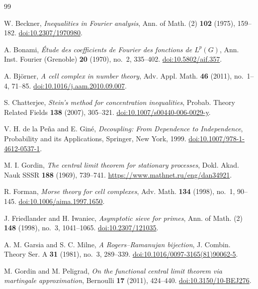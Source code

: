 \documentclass[11pt]{amsart}
\numberwithin{equation}{section}
\theoremstyle{plain}
\theoremstyle{definition}
\theoremstyle{remark}
\begin{document}
\begin{thebibliography}{99}

W. Beckner,
\emph{Inequalities in Fourier analysis},
Ann. of Math. (2) \textbf{102} (1975), 159--182.
\href{https://doi.org/10.2307/1970980}{doi:10.2307/1970980}.

A. Bonami,
\emph{\'Etude des coefficients de Fourier des fonctions de \(L^p(G)\)},
Ann. Inst. Fourier (Grenoble) \textbf{20} (1970), no.~2, 335--402.
\href{https://doi.org/10.5802/aif.357}{doi:10.5802/aif.357}.

A. Bj\"orner,
\emph{A cell complex in number theory},
Adv. Appl. Math. \textbf{46} (2011), no.~1--4, 71--85.
\href{https://doi.org/10.1016/j.aam.2010.09.007}%
{doi:10.1016/j.aam.2010.09.007}.

S. Chatterjee,
\emph{Stein's method for concentration inequalities},
Probab. Theory Related Fields \textbf{138} (2007), 305--321.
\href{https://doi.org/10.1007/s00440-006-0029-y}{doi:10.1007/s00440-006-0029-y}.

V. H. de la Pe\~na and E. Gin\'e,
\emph{Decoupling: From Dependence to Independence},
Probability and its Applications, Springer, New York, 1999.
\href{https://doi.org/10.1007/978-1-4612-0537-1}{doi:10.1007/978-1-4612-0537-1}.

M. I. Gordin,
\emph{The central limit theorem for stationary processes},
Dokl. Akad. Nauk SSSR \textbf{188} (1969), 739--741.
\url{https://www.mathnet.ru/eng/dan34921}.

R. Forman,
\emph{Morse theory for cell complexes},
Adv. Math. \textbf{134} (1998), no.~1, 90--145.
\href{https://doi.org/10.1006/aima.1997.1650}%
{doi:10.1006/aima.1997.1650}.

J. Friedlander and H. Iwaniec,
\emph{Asymptotic sieve for primes},
Ann. of Math. (2) \textbf{148} (1998), no.~3, 1041--1065.
\href{https://doi.org/10.2307/121035}{doi:10.2307/121035}.

A. M. Garsia and S. C. Milne,
\emph{A Rogers--Ramanujan bijection},
J. Combin. Theory Ser. A \textbf{31} (1981), no.~3, 289--339.
\href{https://doi.org/10.1016/0097-3165(81)90062-5}%
{doi:10.1016/0097-3165(81)90062-5}.

M. Gordin and M. Peligrad,
\emph{On the functional central limit theorem via martingale approximation},
Bernoulli \textbf{17} (2011), 424--440.
\href{https://doi.org/10.3150/10-BEJ276}{doi:10.3150/10-BEJ276}.


\end{thebibliography}
\end{document}
